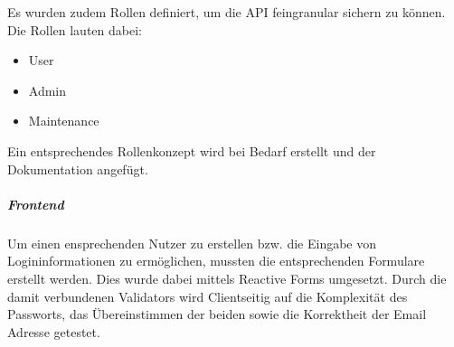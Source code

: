 Es wurden zudem Rollen definiert, um die API feingranular sichern zu können. Die Rollen lauten dabei: 

\begin{itemize}
	\item User
	\item Admin
	\item Maintenance
\end{itemize}

Ein entsprechendes Rollenkonzept wird bei Bedarf erstellt und der Dokumentation angefügt. 

\subparagraph{Frontend}

Um einen ensprechenden Nutzer zu erstellen bzw. die Eingabe von Logininformationen zu ermöglichen, mussten die entsprechenden Formulare erstellt werden. Dies wurde dabei mittels Reactive Forms umgesetzt. Durch die damit verbundenen Validators wird Clientseitig auf die Komplexität des Passworts, das Übereinstimmen der beiden sowie die Korrektheit der Email Adresse getestet. 

